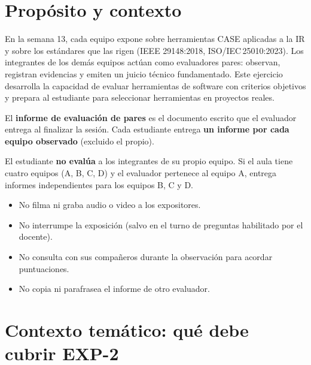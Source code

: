 \documentclass[11pt]{article}
\begin{document}
\section{\textcolor{utegreendk}{Propósito y contexto}}

En la semana 13, cada equipo expone sobre herramientas CASE aplicadas a la IR y sobre los estándares que las rigen (IEEE 29148:2018, ISO/IEC\,25010:2023). Los integrantes de los demás equipos actúan como evaluadores pares: observan, registran evidencias y emiten un juicio técnico fundamentado. Este ejercicio desarrolla la capacidad de evaluar herramientas de software con criterios objetivos y prepara al estudiante para seleccionar herramientas en proyectos reales.

El \textbf{informe de evaluación de pares} es el documento escrito que el evaluador entrega al finalizar la sesión. Cada estudiante entrega \textbf{un informe por cada equipo observado} (excluido el propio).

\begin{cajaclave}[title=Regla de exclusión]
	El estudiante \textbf{no evalúa} a los integrantes de su propio equipo. Si el aula tiene cuatro equipos (A, B, C, D) y el evaluador pertenece al equipo A, entrega informes independientes para los equipos B, C y D.
\end{cajaclave}

\begin{cajaclave}[title=Qué NO debe hacer el evaluador]
	\begin{itemize}[leftmargin=14pt,itemsep=2pt]
		\item No filma ni graba audio o video a los expositores.
		\item No interrumpe la exposición (salvo en el turno de preguntas habilitado por el docente).
		\item No consulta con sus compañeros durante la observación para acordar puntuaciones.
		\item No copia ni parafrasea el informe de otro evaluador.
	\end{itemize}
\end{cajaclave}

\section{\textcolor{utegreendk}{Contexto temático: qué debe cubrir EXP-2}}
\end{document}
